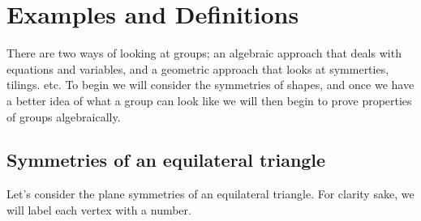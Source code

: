 \documentclass{article}
\begin{document}
\tableofcontents


\section{Examples and Definitions}

There are two ways of looking at groups; an algebraic approach that deals with equations and variables, and a geometric approach that looks at symmerties, tilings. etc. To begin we will consider the symmetries of shapes, and once we have a better idea of what a group can look like we will then begin to prove properties of groups algebraically.

\subsection{Symmetries of an equilateral triangle}

Let's consider the plane symmetries of an equilateral triangle. For clarity sake, we will label each vertex with a number.
\begin{center}
\end{center}
\end{document}
